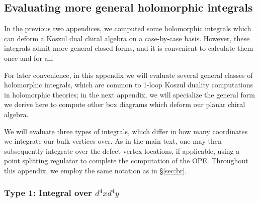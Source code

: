 \documentclass[a4paper,11pt]{article}
\begin{document}
\subsection{Evaluating more general holomorphic integrals}\label{appx:integral}

In the previous two appendices, we computed some holomorphic integrals which can deform a Koszul dual chiral algebra on a case-by-case basis. However, these integrals admit more general closed forms, and it is convenient to calculate them once and for all. 

For later convenience, in this appendix we will evaluate several general classes of holomorphic integrals, which are common to 1-loop Koszul duality computations in holomorphic theories; in the next appendix, we will specialize the general form we derive here to compute other box diagrams which deform our planar chiral algebra. 

We will evaluate three types of integrals, which differ in how many coordinates we integrate our bulk vertices over. As in the main text, one may then subsequently integrate over the defect vertex locations, if applicable, using a point splitting regulator to complete the computation of the OPE.  Throughout this appendix, we employ the same notation as in \S \ref{sec:br}.

\subsubsection{Type 1: Integral over $d^4x d^4 y$} 
\end{document}
